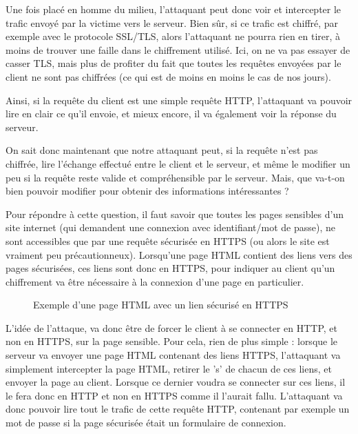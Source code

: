 Une fois placé en homme du milieu, l'attaquant peut donc voir et intercepter le trafic envoyé par la victime vers le serveur. Bien sûr, si ce trafic est chiffré, par exemple avec le protocole SSL/TLS, alors l'attaquant ne pourra rien en tirer, à moins de trouver une faille dans le chiffrement utilisé. Ici, on ne va pas essayer de casser TLS, mais plus de profiter du fait que toutes les requêtes envoyées par le client ne sont pas chiffrées (ce qui est de moins en moins le cas de nos jours).

Ainsi, si la requête du client est une simple requête HTTP, l'attaquant va pouvoir lire en clair ce qu'il envoie, et mieux encore, il va également voir la réponse du serveur.

On sait donc maintenant que notre attaquant peut, si la requête n'est pas chiffrée, lire l'échange effectué entre le client et le serveur, et même le modifier un peu si la requête reste valide et compréhensible par le serveur. Mais, que va-t-on bien pouvoir modifier pour obtenir des informations intéressantes ?

Pour répondre à cette question, il faut savoir que toutes les pages sensibles d'un site internet (qui demandent une connexion avec identifiant/mot de passe), ne sont accessibles que par une requête sécurisée en HTTPS (ou alors le site est vraiment peu précautionneux). Lorsqu'une page HTML contient des liens vers des pages sécurisées, ces liens sont donc en HTTPS, pour indiquer au client qu'un chiffrement va être nécessaire à la connexion d'une page en particulier.

\begin{figure}[H]
  \caption{Exemple d'une page HTML avec un lien sécurisé en HTTPS}
\end{figure}

L'idée de l'attaque, va donc être de forcer le client à se connecter en HTTP, et non en HTTPS, sur la page sensible. Pour cela, rien de plus simple : lorsque le serveur va envoyer une page HTML contenant des liens HTTPS, l'attaquant va simplement intercepter la page HTML, retirer le 's' de chacun de ces liens, et envoyer la page au client. Lorsque ce dernier voudra se connecter sur ces liens, il le fera donc en HTTP et non en HTTPS comme il l'aurait fallu. L'attaquant va donc pouvoir lire tout le trafic de cette requête HTTP, contenant par exemple un mot de passe si la page sécurisée était un formulaire de connexion.

